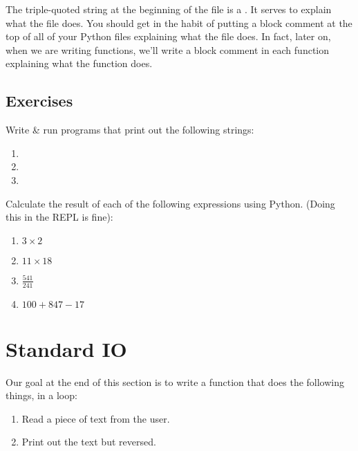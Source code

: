 \begin{remark}
  The triple-quoted string at the beginning of the file is a
  . It serves to explain what the file does. You
  should get in the habit of putting a block comment at the top of all
  of your Python files explaining what the file does. In fact, later
  on, when we are writing functions, we'll write a block comment in
  each function explaining what the function does.
\end{remark}

\subsection{Exercises}

\begin{exercise}
  Write \& run programs that print out the following strings:

  \begin{enumerate}
  \item {}
  \item {}
  \item {}
  \end{enumerate}
\end{exercise}

\begin{exercise}
  Calculate the result of each of the following expressions using
  Python. (Doing this in the REPL is fine):

  \begin{enumerate}
  \item $3 \times 2$
  \item $11 \times 18$
  \item $\frac{541}{241}$
  \item $100 + 847 - 17$
  \end{enumerate}
\end{exercise}

\section{Standard IO}

Our goal at the end of this section is to write a function that does
the following things, in a loop:

\begin{enumerate}
\item Read a piece of text from the user.
\item Print out the text but reversed.
\end{enumerate}

